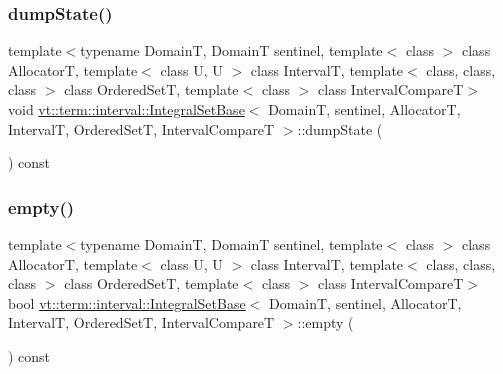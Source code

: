 \mbox{\label{structvt_1_1term_1_1interval_1_1_integral_set_base_a1af9b94870159b8796053112c31f9570}} 
\subsubsection{\texorpdfstring{dump\+State()}{dumpState()}}
{\footnotesize\ttfamily template$<$typename DomainT, DomainT sentinel, template$<$ class $>$ class AllocatorT, template$<$ class U, U $>$ class IntervalT, template$<$ class, class, class $>$ class Ordered\+SetT, template$<$ class $>$ class Interval\+CompareT$>$ \\
void \hyperlink{structvt_1_1term_1_1interval_1_1_integral_set_base}{vt\+::term\+::interval\+::\+Integral\+Set\+Base}$<$ DomainT, sentinel, AllocatorT, IntervalT, Ordered\+SetT, Interval\+CompareT $>$\+::dump\+State (\begin{DoxyParamCaption}{ }\end{DoxyParamCaption}) const\hspace{0.3cm}{\ttfamily [inline]}}

\mbox{\label{structvt_1_1term_1_1interval_1_1_integral_set_base_aaf1b42550ad04b45edf7bb0b120a3ea5}} 
\subsubsection{\texorpdfstring{empty()}{empty()}}
{\footnotesize\ttfamily template$<$typename DomainT, DomainT sentinel, template$<$ class $>$ class AllocatorT, template$<$ class U, U $>$ class IntervalT, template$<$ class, class, class $>$ class Ordered\+SetT, template$<$ class $>$ class Interval\+CompareT$>$ \\
bool \hyperlink{structvt_1_1term_1_1interval_1_1_integral_set_base}{vt\+::term\+::interval\+::\+Integral\+Set\+Base}$<$ DomainT, sentinel, AllocatorT, IntervalT, Ordered\+SetT, Interval\+CompareT $>$\+::empty (\begin{DoxyParamCaption}{ }\end{DoxyParamCaption}) const\hspace{0.3cm}{\ttfamily [inline]}}

